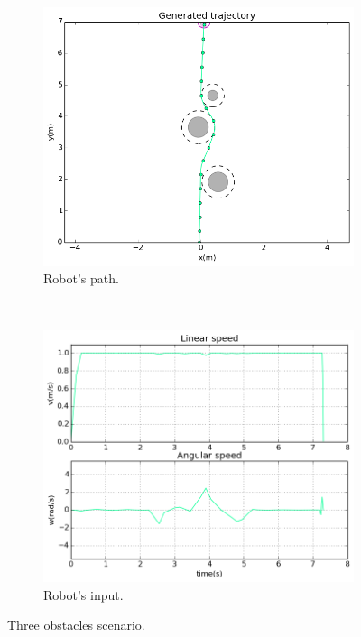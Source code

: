 \begin{figure}
        \centering
        ~ %
        \begin{subfigure}[b]{0.48\textwidth}
                \includegraphics[width=\textwidth]{./img/realtime/sim_results/multirobot-path.png}
                \caption{Robot's path.}\label{fig:rpath}
        \end{subfigure}
        ~ %
        \begin{subfigure}[b]{0.48\textwidth}
		\includegraphics[width=\textwidth]{./img/realtime/sim_results/multirobot-vw.png}
                \caption{Robot's input.}\label{fig:rinput}
        \end{subfigure}
        \caption{Three obstacles scenario.}\label{fig:uni3}
\end{figure}

